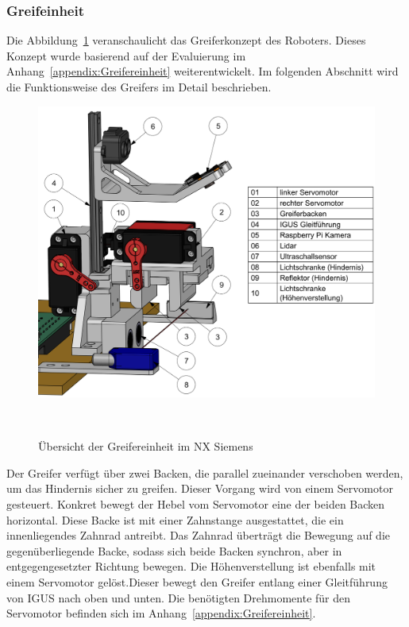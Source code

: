 \documentclass[main.tex]{subfiles} %
\begin{document}

\subsubsection{Greifeinheit}


Die Abbildung~\ref{fig:Greifereinheit} veranschaulicht das Greiferkonzept des Roboters. Dieses Konzept wurde basierend auf der Evaluierung 
im Anhang~\ref{appendix:Greifereinheit} weiterentwickelt. Im folgenden Abschnitt wird die Funktionsweise des Greifers im Detail beschrieben.

\begin{figure}[H]
    \centering
    \includegraphics[width=1\textwidth]{Greifereinheit_Uebersicht.png}
    \caption{Übersicht der Greifereinheit im NX Siemens}~\label{fig:Greifereinheit}
\end{figure}

Der Greifer verfügt über zwei Backen, die parallel zueinander verschoben werden, um das Hindernis sicher zu greifen. 
Dieser Vorgang wird von einem Servomotor gesteuert. Konkret bewegt der Hebel vom Servomotor eine der beiden Backen horizontal. 
Diese Backe ist mit einer Zahnstange ausgestattet, die ein innenliegendes Zahnrad antreibt. Das Zahnrad überträgt die 
Bewegung auf die gegenüberliegende Backe, sodass sich beide Backen synchron, aber in entgegengesetzter Richtung bewegen. 
Die Höhenverstellung ist ebenfalls mit einem Servomotor gelöst.Dieser bewegt den Greifer entlang einer Gleitführung von IGUS 
nach oben und unten. Die benötigten Drehmomente für den Servomotor befinden sich im Anhang~\ref{appendix:Greifereinheit}.
\end{document}
